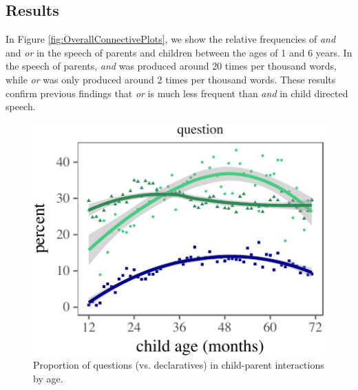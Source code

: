 \documentclass[10pt, letterpaper]{article}
\newenvironment{CodeChunk}{}{}
\begin{document}
\subsection{Results}\label{results}

In Figure \ref{fig:OverallConnectivePlots}, we show the relative
frequencies of \emph{and} and \emph{or} in the speech of parents and
children between the ages of 1 and 6 years. In the speech of parents,
\emph{and} was produced around 20 times per thousand words, while
\emph{or} was only produced around 2 times per thousand words. These
results confirm previous findings that \emph{or} is much less frequent
than \emph{and} in child directed speech.

\begin{CodeChunk}
\begin{figure}[tb]
\includegraphics{figs/utteranceTypeByAgePlot-1} \caption[Proportion of questions (vs]{Proportion of questions (vs. declaratives) in child-parent interactions by age.}\label{fig:utteranceTypeByAgePlot}
\end{figure}
\end{CodeChunk}
\end{document}
